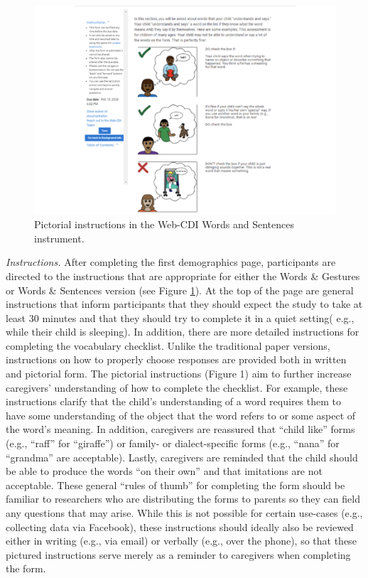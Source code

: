 \documentclass[
  english,
  man]{apa7}
\begin{document}
\begin{figure}
\centering
\includegraphics{webcdi_paper_files/figure-latex/pictorial-1.pdf}
\caption{\label{fig:pictorial}Pictorial instructions in the Web-CDI Words and Sentences instrument.}
\end{figure}

\emph{Instructions.} After completing the first demographics page, participants are directed to the instructions that are appropriate for either the Words \& Gestures or Words \& Sentences version (see Figure \ref{fig:pictorial}). At the top of the page are general instructions that inform participants that they should expect the study to take at least 30 minutes and that they should try to complete it in a quiet setting( e.g., while their child is sleeping). In addition, there are more detailed instructions for completing the vocabulary checklist. Unlike the traditional paper versions, instructions on how to properly choose responses are provided both in written and pictorial form. The pictorial instructions (Figure 1) aim to further increase caregivers' understanding of how to complete the checklist. For example, these instructions clarify that the child's understanding of a word requires them to have some understanding of the object that the word refers to or some aspect of the word's meaning. In addition, caregivers are reassured that \enquote{child like} forms (e.g., \enquote{raff} for \enquote{giraffe}) or family- or dialect-specific forms (e.g., \enquote{nana} for \enquote{grandma} are acceptable). Lastly, caregivers are reminded that the child should be able to produce the words \enquote{on their own} and that imitations are not acceptable. These general \enquote{rules of thumb} for completing the form should be familiar to researchers who are distributing the forms to parents so they can field any questions that may arise. While this is not possible for certain use-cases (e.g., collecting data via Facebook), these instructions should ideally also be reviewed either in writing (e.g., via email) or verbally (e.g., over the phone), so that these pictured instructions serve merely as a reminder to caregivers when completing the form.
\end{document}
